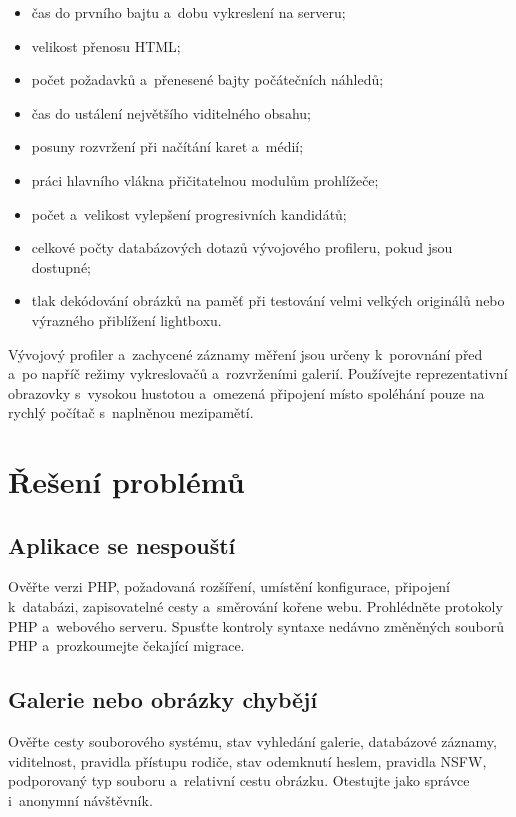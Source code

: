 \documentclass[11pt,a4paper]{article}
\begin{document}
\begin{itemize}
  \item čas do prvního bajtu a~dobu vykreslení na serveru;
  \item velikost přenosu HTML;
  \item počet požadavků a~přenesené bajty počátečních náhledů;
  \item čas do ustálení největšího viditelného obsahu;
  \item posuny rozvržení při načítání karet a~médií;
  \item práci hlavního vlákna přičitatelnou modulům prohlížeče;
  \item počet a~velikost vylepšení progresivních kandidátů;
  \item celkové počty databázových dotazů vývojového profileru, pokud jsou
  dostupné;
  \item tlak dekódování obrázků na paměť při testování velmi velkých originálů
  nebo výrazného přiblížení lightboxu.
\end{itemize}

Vývojový profiler a~zachycené záznamy měření jsou určeny k~porovnání před a~po
napříč režimy vykreslovačů a~rozvrženími galerií. Používejte reprezentativní
obrazovky s~vysokou hustotou a~omezená připojení místo spoléhání pouze na rychlý
počítač s~naplněnou mezipamětí.
\section{Řešení problémů}
\label{sec:troubleshooting}

\subsection{Aplikace se nespouští}

Ověřte verzi PHP, požadovaná rozšíření, umístění konfigurace, připojení
k~databázi, zapisovatelné cesty a~směrování kořene webu. Prohlédněte protokoly
PHP a~webového serveru. Spusťte kontroly syntaxe nedávno změněných souborů PHP
a~prozkoumejte čekající migrace.

\subsection{Galerie nebo obrázky chybějí}

Ověřte cesty souborového systému, stav vyhledání galerie, databázové záznamy,
viditelnost, pravidla přístupu rodiče, stav odemknutí heslem, pravidla NSFW,
podporovaný typ souboru a~relativní cestu obrázku. Otestujte jako správce
i~anonymní návštěvník.
\end{document}
